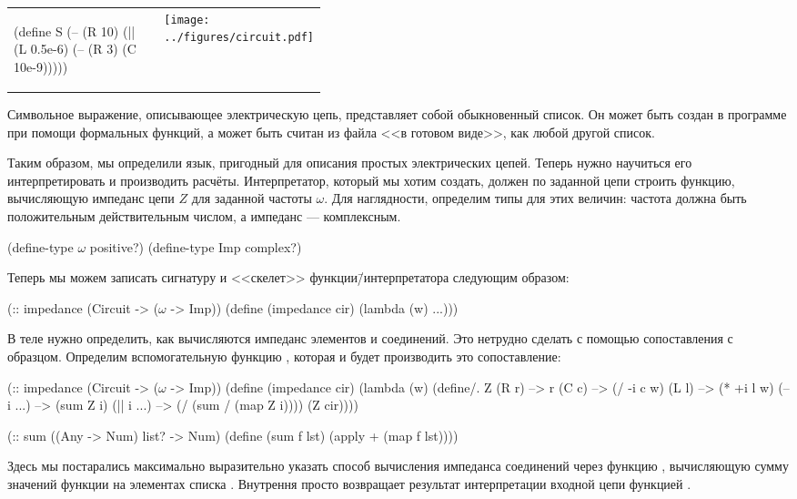 \medskip
\begin{tabular}{lm{0.4\linewidth}}%
\label{S}
\begin{SchemeCode}
(define S
  (-- (R 10)
      (|| (L 0.5e-6)
          (-- (R 3)
              (C 10e-9)))))
\end{SchemeCode}
&
\texttt{[image: ../figures/circuit.pdf]}
\end{tabular}
\vspace{-\medskipamount}
Символьное выражение, описывающее электрическую цепь, представляет собой обыкновенный список. Он может быть создан в программе при помощи формальных функций, а может быть считан из файла <<в готовом виде>>, как любой другой список.

Таким образом, мы определили язык, пригодный для описания простых электрических цепей. Теперь нужно научиться его интерпретировать и производить расчёты. Интерпретатор, который мы хотим создать, должен по заданной цепи строить функцию, вычисляющую импеданс цепи $Z$ для заданной частоты $\omega$. 
Для наглядности, определим типы для этих величин: частота должна быть положительным действительным числом, а импеданс --- комплексным.
\begin{Definition}
 (define-type $\omega$ positive?)
 (define-type Imp complex?)
\end{Definition}
Теперь мы можем записать сигнатуру и <<скелет>> функции\=/интерпретатора  следующим образом:

\begin{SchemeCode}[emph={cir,w}]
(:: impedance (Circuit -> ($\omega$ -> Imp))
 (define (impedance cir)
   (lambda (w) ...)))
\end{SchemeCode}

В теле  нужно определить, как вычисляются импеданс элементов и соединений. Это нетрудно сделать с помощью сопоставления с образцом. Определим вспомогательную функцию , которая и будет производить это сопоставление:
\begin{Definition}[emph={cir,w}]
(:: impedance (Circuit -> ($\omega$ -> Imp))
 (define (impedance cir)
   (lambda (w) 
     (define/. Z
       (R r) --> r
       (C c) --> (/ -i c w)
       (L l) --> (* +i l w)
       (-- i ...) --> (sum Z i)
       (|| i ...) --> (/ (sum / (map Z i))))
     (Z cir))))

(:: sum ((Any -> Num) list? -> Num)
  (define (sum f lst) 
    (apply + (map f lst))))
\end{Definition}
Здесь мы постарались максимально выразительно указать способ вычисления импеданса соединений через функцию , вычисляющую сумму значений функции  на элементах списка . Внутрення   просто возвращает результат интерпретации входной цепи  функцией .

